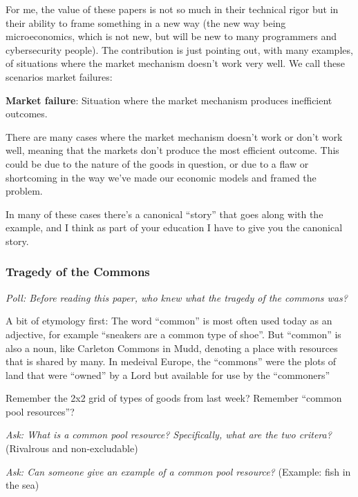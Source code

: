 \documentclass[11pt]{article}
\begin{document}
For me, the value of these papers is not so much in their technical rigor but in their ability to frame something in a new way (the new way being microeconomics, which is not new, but will be new to many programmers and cybersecurity people). The contribution is just pointing out, with many examples, of situations where the market mechanism doesn't work very well. We call these scenarios market failures:

{\bf Market failure}: Situation where the market mechanism produces inefficient outcomes.

There are many cases where the market mechanism doesn't work or don't work well, meaning that the markets don't  produce the most efficient outcome. This could be due to the nature of the goods in question, or due to a flaw or shortcoming in the way we've made our economic models and framed the problem.

In many of these cases there's a canonical ``story'' that goes along with the example, and I think as part of your education I have to give you the canonical story.

\subsubsection{Tragedy of the Commons}

{\it Poll: Before reading this paper, who knew what the tragedy of the commons was?}

A bit of etymology first: The word ``common'' is most often used today as an adjective, for example ``sneakers are a common type of shoe''.
But ``common'' is also a noun, like Carleton Commons in Mudd, denoting a place with resources that is shared by many. In medeival Europe, the ``commons'' were the plots of land that were ``owned'' by a Lord but available for use by the ``commoners''

Remember the 2x2 grid of types of goods from last week? Remember ``common pool resources''?

{\it Ask: What is a common pool resource? Specifically, what are the two critera?} (Rivalrous and non-excludable)

{\it Ask: Can someone give an example of a common pool resource?} (Example: fish in the sea)
\end{document}
